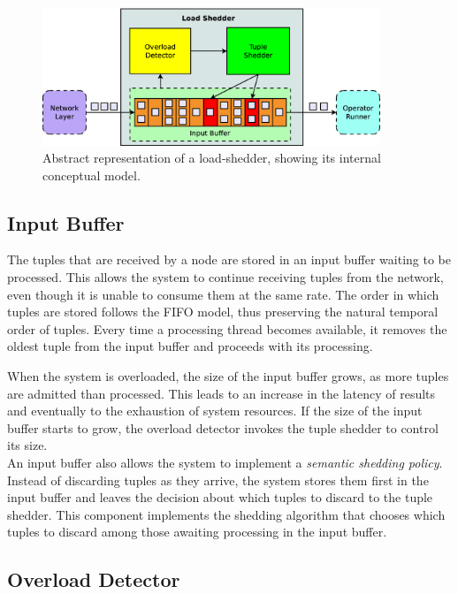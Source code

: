 \begin{figure}[b]
	\centering
	\includegraphics[width=0.9\textwidth]{img/tesi/ls_model} 
	\caption{Abstract representation of a load-shedder, showing its internal conceptual model.}
	\label{fig:ls_model}
\end{figure}   

\subsection*{Input Buffer} 

The tuples that are received by a node are stored in an input buffer waiting to be
processed.
This allows the system to continue receiving tuples from the network, even though it is unable to consume
them at the same rate.
The order in which tuples are stored follows the FIFO model, thus preserving the natural temporal
order of tuples. Every time a processing thread becomes available, it removes the oldest tuple from the
input buffer and proceeds with its processing. 

When the system is overloaded, the size of the input buffer grows, as more tuples are admitted than
processed. This leads to an increase in the latency of results and eventually to the exhaustion of system resources.
If the size of the input buffer starts to grow, the overload detector invokes the
tuple shedder to control its size.\\
An input buffer also allows the system to implement a \emph{semantic shedding policy}.
Instead of discarding tuples as they arrive, the system stores them first in the
input buffer and leaves the decision about which tuples to discard to the tuple shedder. This component
implements the shedding algorithm that chooses which tuples to discard among those
awaiting processing in the input buffer.

\subsection*{Overload Detector} 

